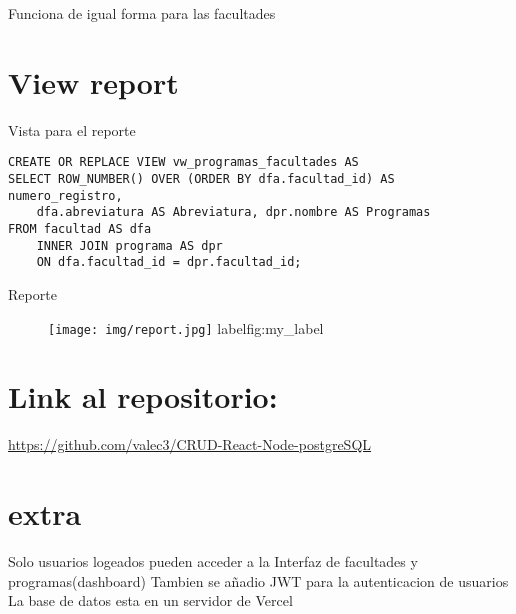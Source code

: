 \documentclass[12pt]{article}
\begin{document}
\large{Funciona de igual forma para las facultades}

\section{View report}
\large {Vista para el reporte}
\begin{verbatim}
CREATE OR REPLACE VIEW vw_programas_facultades AS 
SELECT ROW_NUMBER() OVER (ORDER BY dfa.facultad_id) AS numero_registro,
    dfa.abreviatura AS Abreviatura, dpr.nombre AS Programas
FROM facultad AS dfa
    INNER JOIN programa AS dpr
    ON dfa.facultad_id = dpr.facultad_id;
\end{verbatim}

\large{Reporte}
\begin{figure}[H]
    \centering
    \texttt{[image: img/report.jpg]}
    label{fig:my_label}
\end{figure}
\section{Link al repositorio:} 
\url{https://github.com/valec3/CRUD-React-Node-postgreSQL}

\section{extra}

\large{Solo usuarios logeados pueden acceder a la Interfaz de facultades y programas(dashboard)}
\large{Tambien se añadio JWT para la autenticacion de usuarios}
\large{La base de datos esta en un servidor de Vercel}
\end{document}
